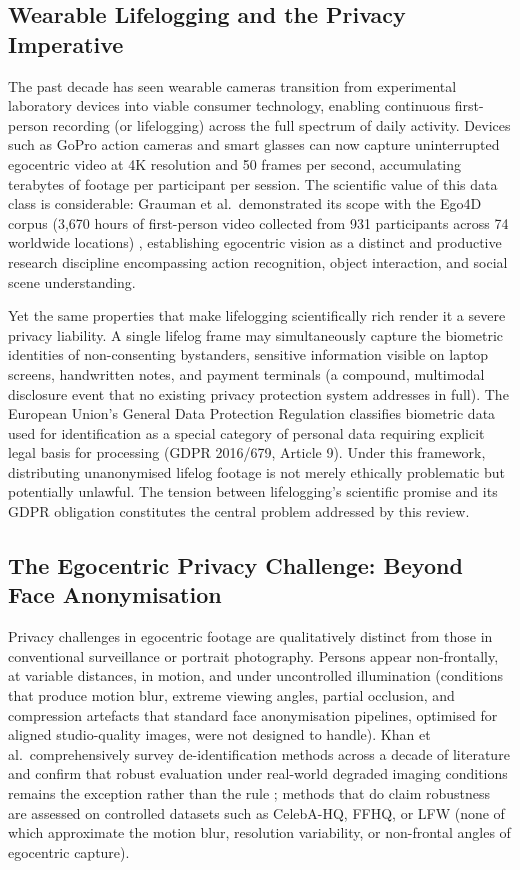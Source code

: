 \documentclass[12pt, onecolumn]{IEEEtran}
\begin{document}
\subsection{Wearable Lifelogging and the Privacy Imperative}

The past decade has seen wearable cameras transition from experimental laboratory devices into viable consumer
technology, enabling continuous first-person recording (or lifelogging) across the full spectrum of daily
activity. Devices such as GoPro action cameras and smart glasses can now capture uninterrupted egocentric video
at 4K resolution and 50 frames per second, accumulating terabytes of footage per participant per session. The
scientific value of this data class is considerable: Grauman et al.\ demonstrated its scope with the Ego4D corpus
(3,670 hours of first-person video collected from 931 participants across 74 worldwide locations) \cite{grauman2022ego4d},
establishing egocentric vision as a distinct and productive research discipline encompassing action recognition,
object interaction, and social scene understanding.

Yet the same properties that make lifelogging scientifically rich render it a severe privacy liability. A single
lifelog frame may simultaneously capture the biometric identities of non-consenting bystanders, sensitive
information visible on laptop screens, handwritten notes, and payment terminals (a compound, multimodal
disclosure event that no existing privacy protection system addresses in full). The European Union's General Data
Protection Regulation classifies biometric data used for identification as a special category of personal data
requiring explicit legal basis for processing (GDPR 2016/679, Article 9). Under this framework, distributing
unanonymised lifelog footage is not merely ethically problematic but potentially unlawful. The tension between
lifelogging's scientific promise and its GDPR obligation constitutes the central problem addressed by this review.

\subsection{The Egocentric Privacy Challenge: Beyond Face Anonymisation}

Privacy challenges in egocentric footage are qualitatively distinct from those in conventional surveillance or
portrait photography. Persons appear non-frontally, at variable distances, in motion, and under uncontrolled
illumination (conditions that produce motion blur, extreme viewing angles, partial occlusion, and compression
artefacts that standard face anonymisation pipelines, optimised for aligned studio-quality images, were not
designed to handle). Khan et al.\ comprehensively survey de-identification methods across a decade of literature and
confirm that robust evaluation under real-world degraded imaging conditions remains the exception rather than
the rule \cite{khan2024survey}; methods that do claim robustness are assessed on controlled datasets such as CelebA-HQ, FFHQ,
or LFW (none of which approximate the motion blur, resolution variability, or non-frontal angles of
egocentric capture).
\end{document}
